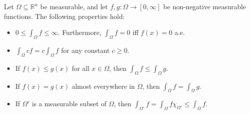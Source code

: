 \begin{theorem}
    Let $\Omega \subseteq \mathbb{R}^n$ be measurable, and let $f, g: \Omega \rightarrow [0, \infty]$ be non-negative measurable functions. The following properties hold:
    \begin{itemize}
        \item[(a)] $0 \le \int_\Omega f \le \infty$. Furthermore, $\int_\Omega f = 0$ iff $f(x) = 0$ a.e.
        \item[(b)] $\int_\Omega cf = c \int_\Omega f$ for any constant $c \ge 0$.
        \item[(c)] If $f(x) \le g(x)$ for all $x \in \Omega$, then $\int_\Omega f \le \int_\Omega g$.
        \item[(d)] If $f(x) = g(x)$ almost everywhere in $\Omega$, then $\int_\Omega f = \int_\Omega g$.
        \item[(e)] If $\Omega'$ is a measurable subset of $\Omega$, then $\int_{\Omega'} f = \int_\Omega f \chi_{\Omega'} \le \int_\Omega f$.
    \end{itemize}
\end{theorem}

